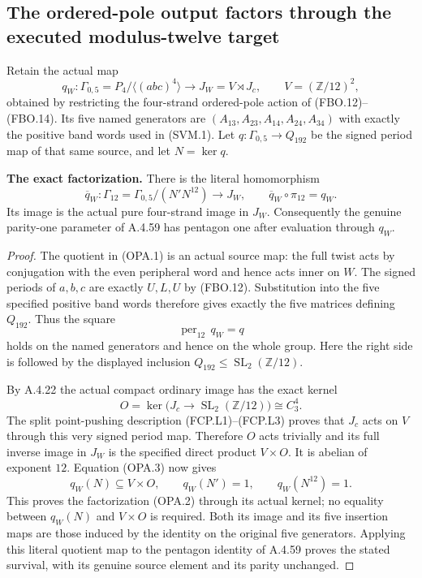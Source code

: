 \subsection{The ordered-pole output factors through the executed modulus-twelve target}

Retain the actual map
\[
 q_W:\Gamma_{0,5}=P_4/\langle(abc)^4\rangle
       \longrightarrow J_W=V\rtimes J_c,
 \qquad V=(\mathbb Z/12)^2,
\tag{OPA.1}
\]
obtained by restricting the four-strand ordered-pole action of
(FBO.12)--(FBO.14).  Its five named generators are
$(A_{13},A_{23},A_{14},A_{24},A_{34})$ with exactly the positive band
words used in (SVM.1).  Let
$q:\Gamma_{0,5}\to Q_{192}$ be the signed period map of that same
source, and let $N=\ker q$.

\par\medskip\noindent\textbf{The exact factorization.}\quad
There is the literal homomorphism
\[
 \overline q_W:\Gamma_{12}=\Gamma_{0,5}/(N'N^{12})
         \longrightarrow J_W,
 \qquad \overline q_W\circ\pi_{12}=q_W.
\tag{OPA.2}
\]
Its image is the actual pure four-strand image in $J_W$.
Consequently the genuine parity-one parameter of A.4.59 has pentagon
one after evaluation through $q_W$.

\begin{proof}
The quotient in (OPA.1) is an actual source map: the full twist acts
by conjugation with the even peripheral word and hence acts inner
on $W$.  The signed periods of $a,b,c$ are exactly $U,L,U$ by
(FBO.12).  Substitution into the five specified positive band words
therefore gives exactly the five matrices defining $Q_{192}$.
Thus the square
\[
 \operatorname{per}_{12}\,q_W=q
\tag{OPA.3}
\]
holds on the named generators and hence on the whole group.
Here the right side is followed by the displayed inclusion
$Q_{192}\leq\operatorname{SL}_2(\mathbb Z/12)$.

By A.4.22 the actual compact ordinary image has the exact kernel
\[
 O=\ker\bigl(J_c\longrightarrow
              \operatorname{SL}_2(\mathbb Z/12)\bigr)
       \cong C_3^4.
\tag{OPA.4}
\]
The split point-pushing description (FCP.L1)--(FCP.L3) proves that
$J_c$ acts on $V$ through this very signed period map.  Therefore
$O$ acts trivially and its full inverse image in $J_W$ is the
specified direct product $V\times O$.  It is abelian of exponent
$12$.  Equation (OPA.3) now gives
\[
 q_W(N)\subseteq V\times O,
 \qquad q_W(N')=1,\qquad q_W(N^{12})=1.
\tag{OPA.5}
\]
This proves the factorization (OPA.2) through its actual kernel;
no equality between $q_W(N)$ and $V\times O$ is required.
Both its image and its five insertion maps are those induced by the
identity on the original five generators.  Applying this literal
quotient map to the pentagon identity of A.4.59 proves the stated
survival, with its genuine source element and its parity unchanged.
\end{proof}

